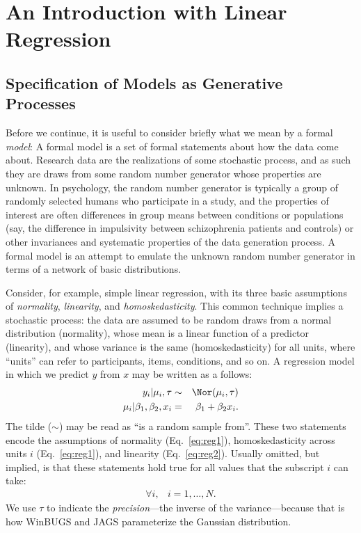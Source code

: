 \section{An Introduction with Linear Regression}
\subsection{Specification of Models as Generative Processes}

Before we continue, it is useful to consider briefly what we mean by a formal \emph{model}: A formal model is a set of formal statements about how the data come about. Research data are the realizations of some stochastic process, and as such they are draws from some random number generator whose properties are unknown. {In psychology, the random number generator is typically a group of randomly selected humans who participate in a study, and the properties of interest are often differences in group means between conditions or populations (say, the difference in impulsivity between schizophrenia patients and controls) or other invariances and systematic properties of the data generation process.} A formal model is an attempt to emulate the unknown random number generator in terms of a network of basic distributions.

Consider, for example, simple linear regression, with its three basic assumptions of \emph{normality}, \emph{linearity}, and \emph{homoskedasticity}. This common technique implies a stochastic process: the data are assumed to be random draws from a normal distribution (normality), whose mean is a linear function of a predictor (linearity), and whose variance is the same (homoskedasticity) for all units, where ``units'' can refer to participants, items, conditions, and so on. A regression model in which we predict $y$ from $x$ may be written as a follows:
\begin{eqnarray}
y_i | \mu_i, \tau &\sim& \Nor(\mu_i, \tau) \label{eq:reg1}\\
\mu_i |\beta_1, \beta_2, x_i &=&\beta_1 + \beta_2 x_i. \label{eq:reg2}
\end{eqnarray}
The tilde ($\sim$) may be read as ``is a random sample from''. These two statements encode the assumptions of normality (Eq.~\ref{eq:reg1}), homoskedasticity across units $i$ (Eq.~\ref{eq:reg1}), and linearity (Eq.~\ref{eq:reg2}). Usually omitted, but implied, is that these statements hold true for all values that the subscript $i$ can take:
\begin{eqnarray}\forall i, & i=1,\ldots,N.\label{eq:reg3}\end{eqnarray} We use $\tau$ to indicate the \emph{precision}---the inverse of the variance---because that is how WinBUGS and JAGS parameterize the Gaussian distribution.

